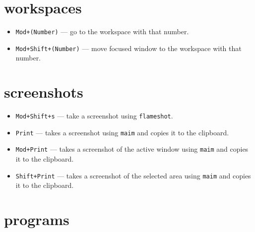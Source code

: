 \documentclass{article}
\begin{document}
\section*{workspaces}

\vspace*{-.5\baselineskip}
\begin{itemize}
	\item \texttt{Mod+(Number)} --- go to the workspace with that number.
	\item \texttt{Mod+Shift+(Number)} --- move focused window to the workspace with that number.
\end{itemize}

\section*{screenshots}

\vspace*{-.5\baselineskip}
\begin{itemize}
	\item \texttt{Mod+Shift+s} --- take a screenshot using \texttt{flameshot}.
	\item \texttt{Print} --- takes a screenshot using \texttt{maim} and copies it to the clipboard.
	\item \texttt{Mod+Print} --- takes a screenshot of the active window using \texttt{maim} and copies it to the clipboard.
	\item \texttt{Shift+Print} --- takes a screenshot of the selected area using \texttt{maim} and copies it to the clipboard.
\end{itemize}

\section*{programs}
\end{document}
